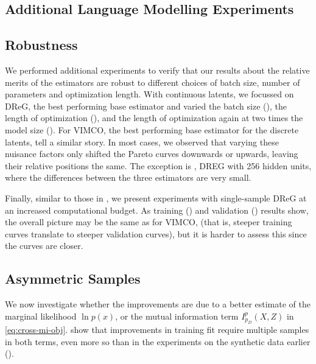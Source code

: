 \begin{subappendices}
\section{Additional Language Modelling Experiments}
\label{sec:additional-language-modelling-experiments}

\subsection{Robustness}
\label{sec:additional-language-modelling-experiments-robustness}

We performed additional experiments to verify that our results about the relative merits of the estimators are robust to different choices of batch size, number of parameters and optimization length.
With continuous latents, we focussed on DReG, the best performing base estimator and varied the batch size (), the length of optimization (), and the length of optimization again at two times the model size ().
For VIMCO, the best performing base estimator for the discrete latents,  tell a similar story.
In most cases, we observed that varying these nuisance factors only shifted the Pareto curves downwards or upwards, leaving their relative positions the same.
The exception is , DREG with 256 hidden units, where the differences between the three estimators are very small.

Finally, similar to those in , we present experiments with single-sample DReG at an increased computational budget.
As training () and validation () results show, the overall picture may be the same as for VIMCO, (that is, steeper training curves translate to steeper validation curves), but it is harder to assess this since the curves are closer.

\subsection{Asymmetric Samples}
\label{sec:additional-language-modelling-experiments-asymmetric-samples}

We now investigate whether the improvements are due to a better estimate of the marginal likelihood $\ln p(x)$, or the mutual information term $I_{p_D}^p(X,Z)$ in \eqref{eq:cross-mi-obj}.
 show that improvements in training fit require multiple samples in both terms, even more so than in the experiments on the synthetic data earlier ().


\end{subappendices}
